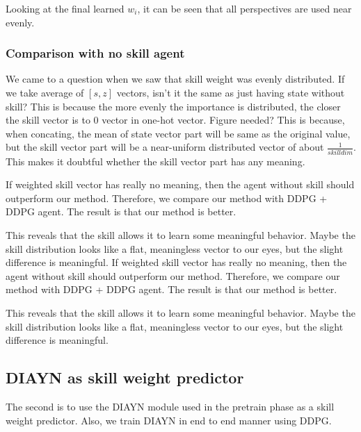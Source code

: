 


Looking at the final learned ${w_i}$, it can be seen that all perspectives are used near evenly.

\subsubsection{Comparison with no skill agent}

We came to a question when we saw that skill weight was evenly distributed.
If we take average of ${[s,z]}$ vectors, isn't it the same as just having state without skill?
This is because the more evenly the importance is distributed, the closer the skill vector is to 0 vector in one-hot vector. Figure needed?
This is because, when concating, the mean of state vector part will be same as the original value,
but the skill vector part will be a near-uniform distributed vector of about $\frac{1}{skilldim}$.
This makes it doubtful whether the skill vector part has any meaning.

If weighted skill vector has really no meaning, then the agent without skill should outperform our method.
Therefore, we compare our method with DDPG + DDPG agent. The result is that our method is better.

This reveals that the skill allows it to learn some meaningful behavior.
Maybe the skill distribution looks like a flat, meaningless vector to our eyes, but the slight difference is meaningful.
If weighted skill vector has really no meaning, then the agent without skill should outperform our method.
Therefore, we compare our method with DDPG + DDPG agent. The result is that our method is better.

This reveals that the skill allows it to learn some meaningful behavior.
Maybe the skill distribution looks like a flat, meaningless vector to our eyes, but the slight difference is meaningful.

\subsection{DIAYN as skill weight predictor}
The second is to use the DIAYN module used in the pretrain phase as a skill weight predictor.
Also, we train DIAYN in end to end manner using DDPG.

